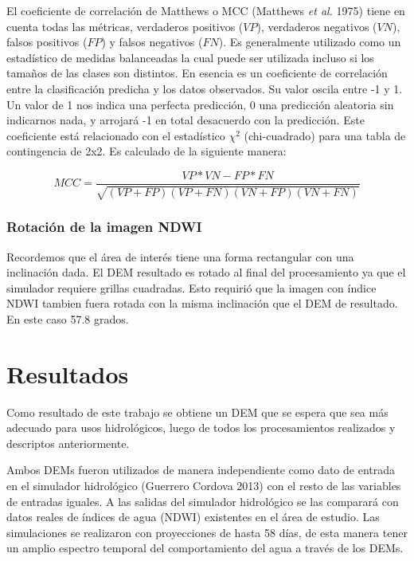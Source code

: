 \documentclass[10pt,a4paper, twoside]{report}
\begin{document}
El coeficiente de correlación de Matthews o MCC (Matthews \textit{et al.} 1975) tiene en cuenta todas las métricas, verdaderos positivos ($VP$), verdaderos negativos ($VN$), falsos positivos ($FP$) y falsos negativos ($FN$). Es generalmente utilizado como un estadístico de medidas balanceadas la cual puede ser utilizada incluso si los tamaños de las clases son distintos. En esencia es un coeficiente de correlación entre la clasificación predicha y los datos observados. Su valor oscila entre -1 y 1. Un valor de 1 nos indica una perfecta predicción, 0 una predicción aleatoria sin indicarnos nada, y arrojará -1 en total desacuerdo con la predicción. Este coeficiente está relacionado con el estadístico ${\chi}^2$ (chi-cuadrado) para una tabla de contingencia de 2x2. Es calculado de la siguiente manera:


\begin{equation}
MCC=\frac{VP*VN - FP*FN}{\sqrt{(VP+FP)(VP+FN)(VN+FP)(VN+FN)}}
\end{equation}



\subsection{Rotación de la imagen NDWI}

Recordemos que el área de interés tiene una forma rectangular con una inclinación dada. El DEM resultado es rotado al final del procesamiento ya que el simulador requiere grillas cuadradas. Esto requirió que la imagen con índice NDWI tambien fuera rotada con la misma inclinación que el DEM de resultado. En este caso 57.8 grados.



\chapter{Resultados}

Como resultado de este trabajo se obtiene un DEM que se espera que sea más adecuado para usos hidrológicos, luego de todos los procesamientos realizados y descriptos anteriormente.


Ambos DEMs fueron utilizados de manera independiente como dato de entrada en el simulador hidrológico (Guerrero Cordova 2013) con el resto de las variables de entradas iguales. A las salidas del simulador hidrológico se las comparará con datos reales de índices de agua (NDWI) existentes en el área de estudio. Las simulaciones se realizaron con proyecciones de hasta 58 días, de esta manera tener un amplio espectro temporal del comportamiento del agua a través de los DEMs.
\end{document}
